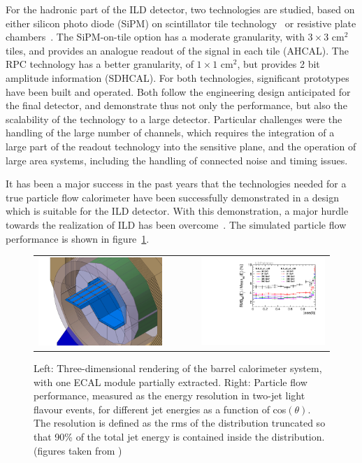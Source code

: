 \documentclass[%
 amsmath,amssymb,
 aps,
 longbibliography,
]{revtex4-1}
\begin{document}
For the hadronic part of the ILD detector, two technologies are studied, based on either silicon photo diode (SiPM) on scintillator tile technology~\cite{Simon:2010mi} or resistive plate chambers~\cite{Laktineh:2010zsa}. The SiPM-on-tile option has a  moderate granularity, with $3 \times 3$ cm$^2$ tiles, and provides an analogue readout of the signal in each tile (AHCAL). The RPC technology has a better granularity, of $1 \times 1$ cm$^2$, but provides 2 bit amplitude information (SDHCAL). For both technologies, significant prototypes have been built and operated. Both follow the engineering design anticipated for the final detector, and demonstrate thus not only the performance, but also the scalability of the technology to a large detector. Particular challenges were the handling of the large number of channels, which requires the integration of a large part of the readout technology into the sensitive plane, and the operation of large area systems, including the handling of connected noise and timing issues. 

It has been a major success in the past years that the technologies needed for a true particle flow calorimeter have been successfully demonstrated in a design which is suitable for the ILD detector. With this demonstration, a major hurdle towards the realization of ILD has been overcome~\cite{Sefkow:2018rhp}. The simulated particle flow performance is shown in figure~\ref{fig:pflow}.
\begin{figure}[th]
    \centering
    \begin{tabular}{lcr}
    \includegraphics[width=0.4\hsize]{figures/ECal_insertion.jpg} & ~~~~ &
    \includegraphics[width=0.48\hsize]{figures/CosThetaLargeSmall.pdf}\\
    \end{tabular}
    \caption{Left: Three-dimensional rendering of the barrel calorimeter system, with one ECAL module partially extracted. Right: Particle flow performance, measured as the energy resolution in two-jet light flavour events, for different jet energies as a function of cos$(\theta)$. The resolution is defined as the rms of the distribution truncated so that 90\% of the total jet energy is contained inside the distribution. (figures taken from \cite{LCWS2018})}
    \label{fig:pflow}
\end{figure}
\end{document}
